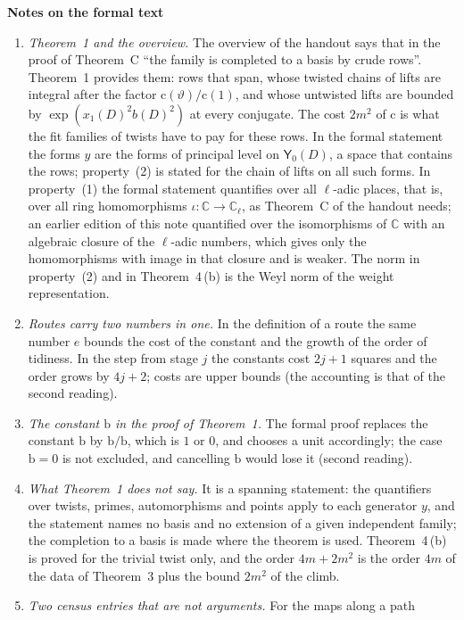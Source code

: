 \documentclass[11pt,a4paper]{article}
\newcommand{\sect}[2]{\refstepcounter{section}\label{#2}\par\addvspace{19pt plus 4pt minus 2pt}\Needspace{7\baselineskip}%
  \noindent\llap{{\fontsize{13.2}{16}\selectfont\bfseries\color{inkfaint}\thesection}\hspace{9pt}}%
  {\fontsize{13.2}{16}\selectfont\bfseries\color{ink}#1}\par\nopagebreak\vspace{-1pt}}
\theoremstyle{plainx}
\theoremstyle{uprightx}
\newcommand{\sY}{\mathsf{Y}}
\newcommand{\rc}{\mathrm{c}}
\newcommand{\CC}{\mathbb{C}}
\begin{document}
\sect{Notes on the formal text}{s:notes}
\begin{enumerate}[label=\textup{\arabic*.},leftmargin=1.6em,itemsep=5pt]
\item \emph{Theorem~1 and the overview.} The overview of the handout says that in the proof of Theorem~C ``the
family is completed to a basis by crude rows''. Theorem~1 provides them: rows that span, whose twisted chains of
lifts are integral after the factor $\rc(\vartheta)/\rc(1)$, and whose untwisted lifts are bounded by
$\exp(x_1(D)^2b(D)^2)$ at every conjugate. The cost $2m^2$ of $\rc$ is what the fit families of twists have to pay for
these rows. In the formal statement the forms $y$ are the forms of principal level on $\sY_0(D)$, a space that
contains the rows; property~(2) is stated for the chain of lifts on all such forms. In property~(1) the formal
statement quantifies over all $\ell$-adic places, that is, over all ring homomorphisms $\iota\colon\CC\to\CC_\ell$,
as Theorem~C of the handout needs; an earlier edition of this note quantified over the isomorphisms of $\CC$ with
an algebraic closure of the $\ell$-adic numbers, which gives only the homomorphisms with image in that closure and
is weaker. The norm in property~(2) and in Theorem~4\,(b) is the Weyl norm of the weight representation.
\item \emph{Routes carry two numbers in one.} In the definition of a route the same number $e$ bounds the cost of
the constant and the growth of the order of tidiness. In the step from stage $j$ the constants cost $2j+1$ squares
and the order grows by $4j+2$; costs are upper bounds (the accounting is that of the second reading).
\item \emph{The constant $\mathrm{b}$ in the proof of Theorem~1.} The formal proof replaces the constant
$\mathrm{b}$ by $\mathrm{b}/\mathrm{b}$, which is $1$ or $0$, and chooses a unit accordingly; the case
$\mathrm{b}=0$ is not excluded, and cancelling $\mathrm{b}$ would lose it (second reading).
\item \emph{What Theorem~1 does not say.} It is a spanning statement: the quantifiers over twists, primes,
automorphisms and points apply to each generator $y$, and the statement names no basis and no extension of a
given independent family; the completion to a basis is made where the theorem is used. Theorem~4\,(b) is proved
for the trivial twist only, and the order $4m+2m^2$ is the order $4m$ of the data of Theorem~3 plus the bound
$2m^2$ of the climb.
\item \emph{Two census entries that are not arguments.} For the maps along a path

\end{enumerate}
\end{document}
